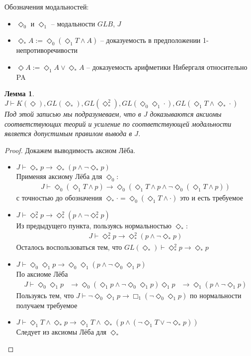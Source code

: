 \documentclass[12pt,a4paper,oneside]{article}
\newtheorem{lemma}{Лемма}
\begin{document}
Обозначения модальностей:
\begin{itemize}
\item $\Diamond_0 $ и $\Diamond_1 $ -- модальности $GLB$, $J$
\item $\Diamond_* A := \Diamond_0 (\Diamond_1 T \wedge  A)$ -- доказуемость в предположении 1-непротиворечивости
\item $\Diamond A  := \Diamond_1 A \vee  \Diamond_* A$ -- доказуемость арифметики Нибергаля относительно PA
\end{itemize}

\begin{lemma}
$J \vdash  K(\Diamond ), GL(\Diamond_* ), GL(\Diamond_* ^2), GL(\Diamond_0 \Diamond_1 \cdot), GL(\Diamond_1 T \wedge  \Diamond_* \cdot)$\\
Под этой записью мы подразумеваем, что в $J$ доказываются аксиомы соответствующих теорий
и усиление по соответствующей модальности является допустимым правилом вывода в $J$.
\end{lemma}
\begin{proof}
Докажем выводимость аксиом Лёба. 
\begin{itemize}
\item $J \vdash  \Diamond_* p \rightarrow  \Diamond_* (p \wedge  \neg \Diamond_* p)$\\
Применяя аксиому Лёба для $\Diamond_0 $:
\begin{align*}
J \vdash  \Diamond_0 (\Diamond_1 T \wedge  p) \rightarrow  \Diamond_0 (\Diamond_1 T \wedge  p \wedge  \neg \Diamond_0 (\Diamond_1 T \wedge  p))
\end{align*}
с точностью до обозначения $\Diamond_* \cdot = \Diamond_0 (\Diamond_1 T \wedge  \cdot)$ это и есть требуемое
\item $J \vdash  \Diamond_* ^2 p \rightarrow  \Diamond_* ^2(p \wedge  \neg \Diamond_* ^2 p)$\\
Из предыдущего пункта, пользуясь нормальностью $\Diamond_* $:
\begin{align*}
J \vdash  \Diamond_* ^2 p \rightarrow  \Diamond_* ^2(p \wedge  \neg \Diamond_* p)
\end{align*}
Осталось воспользоваться тем, что $GL(\Diamond_* ) \vdash  \Diamond_* ^2 p \rightarrow  \Diamond_* p$
\item $J \vdash  \Diamond_0 \Diamond_1 p \rightarrow  \Diamond_0 \Diamond_1 (p \wedge  \neg \Diamond_0 \Diamond_1 p)$\\
По аксиоме Лёба
\begin{align*}
J \vdash  \Diamond_0 \Diamond_1 p &\rightarrow  \Diamond_0 (\Diamond_1 p \wedge  \neg \Diamond_0 \Diamond_1 p)
\Diamond_1 p &\rightarrow  \Diamond_1 (p \wedge  \neg \Diamond_1 p)
\end{align*}
Пользуясь тем, что $J \vdash  \neg \Diamond_0 \Diamond_1 p \rightarrow  \Box_1 (\neg \Diamond_0 \Diamond_1 p)$ по нормальности получаем требуемое
\item $J \vdash  \Diamond_1 T \wedge  \Diamond_* p \rightarrow  \Diamond_1 T \wedge  \Diamond_* (p \wedge  (\neg \Diamond_1 T \vee  \neg \Diamond_* p))$\\
Следует из аксиомы Лёба для $\Diamond_* $
\end{itemize}
\end{proof}
\end{document}
